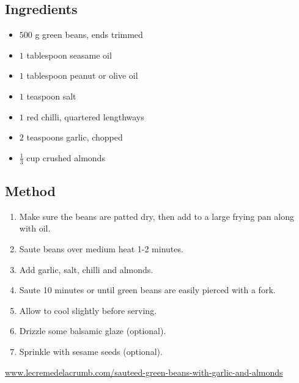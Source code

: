 \documentclass[11pt,a4paper]{article}
\begin{document}
\subsection*{Ingredients}

\begin{itemize}
  \item $ 500 $ \si{\gram} green beans, ends trimmed
  \item $ 1 $ tablespoon seasame oil
  \item $ 1 $ tablespoon peanut or olive oil
  \item $ 1 $ teaspoon salt
  \item $ 1 $ red chilli, quartered lengthways
  \item $ 2 $ teaspoons garlic, chopped
  \item $ \frac{1}{3} $ cup crushed almonds
\end{itemize}

\medskip

\subsection*{Method}

\begin{enumerate}
  \item Make sure the beans are patted dry, then add to a large frying pan along with oil.
  \item Saute beans over medium heat 1-2 minutes.  
  \item Add garlic, salt, chilli and almonds.
  \item Saute 10 minutes or until green beans are easily pierced with a fork. 
  \item Allow to cool slightly before serving.
  \item Drizzle some balsamic glaze (optional).
  \item Sprinkle with sesame seeds (optional).
\end{enumerate}

\href{https://www.lecremedelacrumb.com/sauteed-green-beans-with-garlic-and-almonds/}{www.lecremedelacrumb.com/sauteed-green-beans-with-garlic-and-almonds}
\end{document}
